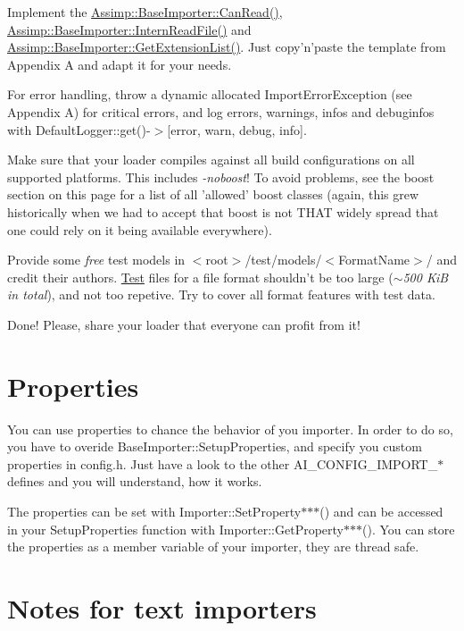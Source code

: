 \begin{DoxyItemize}
\item Implement the \hyperlink{class_assimp_1_1_base_importer_a13588d3396ba5b7ed1f1cb46e0945cfd}{Assimp\+::\+Base\+Importer\+::\+Can\+Read()}, \hyperlink{class_assimp_1_1_base_importer_ac67d9f5ceb26353d27d6be06cccad398}{Assimp\+::\+Base\+Importer\+::\+Intern\+Read\+File()} and \hyperlink{class_assimp_1_1_base_importer_a7ac75d5fcfe8784173bf117a912bafeb}{Assimp\+::\+Base\+Importer\+::\+Get\+Extension\+List()}. Just copy'n'paste the template from Appendix A and adapt it for your needs.  
\item For error handling, throw a dynamic allocated Import\+Error\+Exception (see Appendix A) for critical errors, and log errors, warnings, infos and debuginfos with Default\+Logger\+::get()-\/$>$\mbox{[}error, warn, debug, info\mbox{]}.  
\item Make sure that your loader compiles against all build configurations on all supported platforms. This includes {\itshape -\/noboost}! To avoid problems, see the boost section on this page for a list of all 'allowed' boost classes (again, this grew historically when we had to accept that boost is not T\+H\+A\+T widely spread that one could rely on it being available everywhere).  
\item Provide some {\itshape free} test models in {\ttfamily $<$root$>$/test/models/$<$Format\+Name$>$/} and credit their authors. \hyperlink{class_test}{Test} files for a file format shouldn't be too large ({\itshape $\sim$500 Ki\+B in total}), and not too repetive. Try to cover all format features with test data.  
\item Done! Please, share your loader that everyone can profit from it!  
\end{DoxyItemize}\hypertarget{extend_properties}{}\section{Properties}\label{extend_properties}
You can use properties to chance the behavior of you importer. In order to do so, you have to overide Base\+Importer\+::\+Setup\+Properties, and specify you custom properties in config.\+h. Just have a look to the other A\+I\+\_\+\+C\+O\+N\+F\+I\+G\+\_\+\+I\+M\+P\+O\+R\+T\+\_\+$\ast$ defines and you will understand, how it works.

The properties can be set with Importer\+::\+Set\+Property$\ast$$\ast$$\ast$() and can be accessed in your Setup\+Properties function with Importer\+::\+Get\+Property$\ast$$\ast$$\ast$(). You can store the properties as a member variable of your importer, they are thread safe.\hypertarget{extend_tnote}{}\section{Notes for text importers}\label{extend_tnote}

